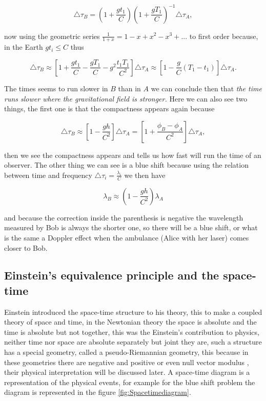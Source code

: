             \begin{equation}
                \triangle \tau_B = \left(1 + \frac{gt_1}{C}\right)\left(1 + \frac{gT_1}{C}\right)^{-1}\triangle\tau_A,
            \end{equation}

            now using the geometric series $\frac{1}{1+x} = 1 - x + x^2 - x^3 + ...$ to first order because, in the Earth $gt_i \leq C$ thus

            \begin{equation}
                \triangle\tau_B \approx \left[1 + \frac{gt_1}{C} - \frac{gT_1}{C} - g^2\frac{t_1T_1}{C^2}\right]\triangle\tau_A \approx \left[1 - \frac{g}{C}(T_1-t_1)\right]\triangle\tau_A.
            \end{equation}

            The times seems to run slower in $B$ than in $A$ we can conclude then that \textit{the time runs slower where the gravitational field is stronger.} Here we can also see two things, the first one is that the compactness appears again because

            \begin{equation}
                \triangle\tau_B \approx \left[1 - \frac{gh}{C^2}\right]\triangle\tau_A = \left[1 +\frac{\phi_B - \phi_A}{C^2}\right]\triangle\tau_A,
            \end{equation}

            then we see the compactness appears and tells us how fast will run the time of an observer. The other thing we can see is a blue shift because using the relation between time and frequency $\triangle\tau_i = \frac{\lambda_i}{C}$ we then have

            \begin{equation}
                \lambda_B \approx \left(1 - \frac{gh}{C^2}\right)\lambda_A
            \end{equation}

            and because the correction inside the parenthesis is negative the wavelength measured by Bob is always the shorter one, so there will be a blue shift, or what is the same a Doppler effect when the ambulance (Alice with her laser) comes closer to Bob.

    \subsection{Einstein's equivalence principle and the space-time}

        Einstein introduced the space-time structure to his theory, this to make a coupled theory of space and time, in the Newtonian theory the space is absolute and the time is absolute but not together, this was the Einstein's contribution to physics, neither time nor space are absolute separately but joint they are, such a structure has a special geometry, called a pseudo-Riemannian geometry, this because in these geometries there are negative and positive or even null vector modulus , their physical interpretation will be discussed later. A space-time diagram is a representation of the physical events, for example for the blue shift problem the diagram is represented in the figure \ref{fig:Spacetimediagram}.

